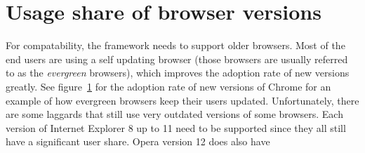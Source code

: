 \documentclass[a4paper,11pt]{kth-mag}
\begin{document}
        \section{Usage share of browser versions}
          For compatability, the framework needs to support older browsers.
          Most of the end users are using a self updating browser (those browsers are usually referred to as the \emph{evergreen} browsers), which improves the adoption rate of new versions greatly.
          See figure~\ref{} for the adoption rate of new versions of Chrome for an example of how evergreen browsers keep their users updated.
          Unfortunately, there are some laggards that still use very outdated versions of some browsers.
          Each version of Internet Explorer 8 up to 11 need to be supported since they all still have a significant user share.
          Opera version 12 does also have 
\end{document}
